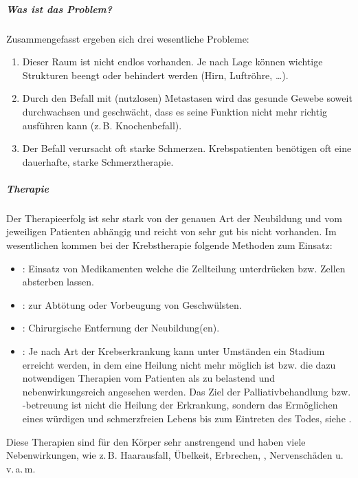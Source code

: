 {\subparagraph{Was ist das Problem?}

Zusammengefasst ergeben sich drei wesentliche Probleme:
\begin{enumerate}
    \item {} Dieser Raum ist
    nicht endlos vorhanden. Je nach Lage können wichtige
    Strukturen beengt oder behindert werden (Hirn,
    Luftröhre, \ldots).
    \item {}
    Durch den Befall mit (nutzlosen) Metastasen wird das
    gesunde Gewebe soweit durchwachsen und geschwächt, dass
    es seine Funktion nicht mehr richtig ausführen kann
    (z.\,B. Knochenbefall).
    \item {} Der Befall verursacht oft starke
    Schmerzen. Krebspatienten benötigen oft eine
    dauerhafte, starke Schmerztherapie.
\end{enumerate}

\subparagraph{Therapie}

Der Therapieerfolg ist sehr stark von der genauen Art der
Neubildung und vom jeweiligen Patienten abhängig und reicht
von sehr gut bis nicht vorhanden. 
Im wesentlichen kommen bei der Krebstherapie folgende
Methoden zum Einsatz:
\begin{itemize}
    \item {}: Einsatz von Medikamenten welche
    die Zellteilung unterdrücken bzw. Zellen absterben
    lassen.
    \item {}: zur Abtötung oder Vorbeugung von
    Geschwülsten.
    \item {}: Chirurgische Entfernung der
    Neubildung(en).
    \item {}: 
    Je nach Art der Krebserkrankung kann unter Umständen ein Stadium erreicht werden, 
    in dem eine Heilung nicht mehr möglich ist 
    bzw. die dazu notwendigen Therapien vom Patienten als zu belastend und nebenwirkungsreich angesehen werden. 
    Das Ziel der {Palliativbehandlung} bzw. -betreuung ist nicht die Heilung der Erkrankung, 
    sondern das Ermöglichen eines würdigen 
    und schmerzfreien Lebens bis zum Eintreten des Todes, 
    siehe .
\end{itemize}
Diese Therapien sind für den Körper sehr anstrengend und
haben viele Nebenwirkungen, wie z.\,B. Haarausfall, Übelkeit,
Erbrechen, , Nervenschäden
u.\,v.\,a.\,m.

\cite{UlfigHistologie1,GantenTumorerkr98,Uicc3}
}
{%

}





\ChapterEnd


